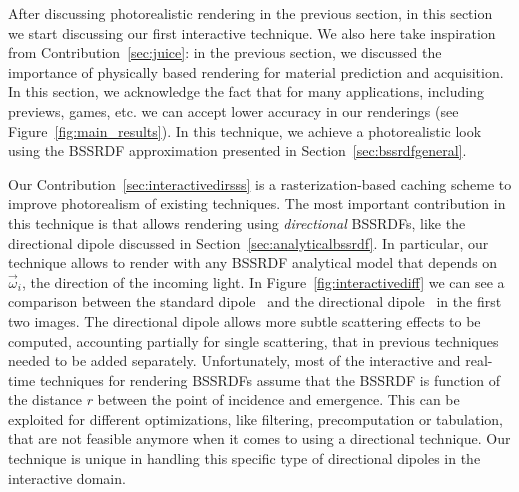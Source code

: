 %
After discussing photorealistic rendering in the previous section, in this section we start discussing our first interactive technique. We also here take inspiration from Contribution~\ref{sec:juice}: in the previous section, we discussed the importance of physically based rendering for material prediction and acquisition. In this section, we acknowledge the fact that for many applications, including previews, games, etc. we can accept lower accuracy in our renderings (see Figure~\ref{fig:main_results}). In this technique, we achieve a photorealistic look using the BSSRDF approximation presented in Section~\ref{sec:bssrdfgeneral}.

Our Contribution~\ref{sec:interactivedirsss} is a rasterization-based caching scheme to improve photorealism of existing techniques. The most important contribution in this technique is that allows rendering using \emph{directional} BSSRDFs, like the directional dipole discussed in Section~\ref{sec:analyticalbssrdf}. In particular, our technique allows to render with any BSSRDF analytical model that depends on $\vec{\omega}_i$, the direction of the incoming light. In Figure~\ref{fig:interactivediff} we can see a  comparison between the standard dipole~\cite{Jensen2001} and the directional dipole~\cite{Frisvad2014} in the first two images. The directional dipole allows more subtle scattering effects to be computed, accounting partially for single scattering, that in previous techniques needed to be added separately. Unfortunately, most of the interactive and real-time techniques for rendering BSSRDFs assume that the BSSRDF is function of the distance $r$ between the point of incidence and emergence. This can be exploited for different optimizations, like filtering, precomputation or tabulation, that are not feasible anymore when it comes to using a directional technique. Our technique is unique in handling this specific type of directional dipoles in the interactive domain. 

